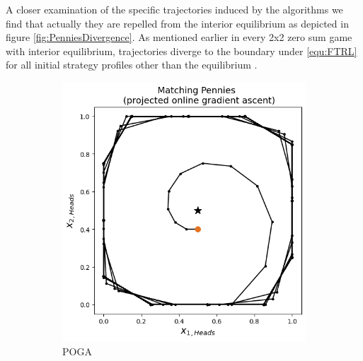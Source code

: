 A closer examination of the specific trajectories induced by the algorithms we find that actually they are repelled from the interior equilibrium as depicted in figure \ref{fig:PenniesDivergence}. As mentioned earlier in every 2x2 zero sum game with interior equilibrium, trajectories diverge to the boundary under \ref{equ:FTRL} for all initial strategy profiles other than the equilibrium \cite{bailey}. 


\begin{figure}[H]
 \captionsetup{justification=centering}
\centering
\begin{subfigure}{.5\textwidth}
    \centering
    \includegraphics[width=\textwidth]{logos/Pennies5.png}
    \caption{POGA}
\end{subfigure}%
\begin{subfigure}{.5\textwidth}
    \centering

\end{subfigure}
\end{figure}

